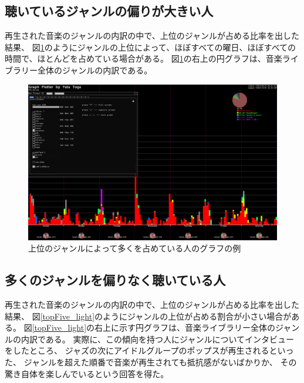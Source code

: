 \documentclass[11pt, onecolumn]{jsarticle}
\begin{document}
\subsection{聴いているジャンルの偏りが大きい人}


再生された音楽のジャンルの内訳の中で、上位のジャンルが占める比率を出した結果、
図\ref{topFive_heavy}のようにジャンルの上位によって、ほぼすべての曜日、ほぼすべての時間で、ほとんどを占めている場合がある。
図\ref{topFive_heavy}の右上の円グラフは、音楽ライブラリー全体のジャンルの内訳である。


\begin{figure}[h]
\begin{center}
\includegraphics[width=14cm]{topFive_heavy.png}
\caption{上位のジャンルによって多くを占めている人のグラフの例}
\label{topFive_heavy}
\end{center}
\end{figure}

\subsection{多くのジャンルを偏りなく聴いている人}
再生された音楽のジャンルの内訳の中で、上位のジャンルが占める比率を出した結果、
図\ref{topFive_light}のようにジャンルの上位が占める割合が小さい場合がある。
図\ref{topFive_light}の右上に示す円グラフは、音楽ライブラリー全体のジャンルの内訳である。
実際に、この傾向を持つ人にジャンルについてインタビューをしたところ、
ジャズの次にアイドルグループのポップスが再生されるといった、
ジャンルを超えた順番で音楽が再生されても抵抗感がないばかりか、
その驚き自体を楽しんでいるという回答を得た。
\end{document}
